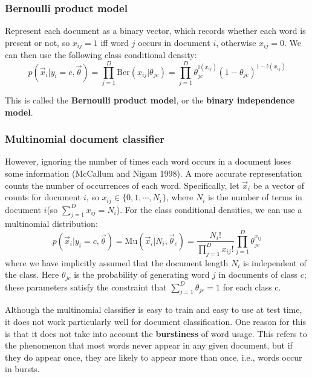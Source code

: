\subsubsection{Bernoulli product model}
Represent each document as a binary vector, which records whether each word is present or not, so $x_{ij} =1$ iff word $j$ occurs in document $i$, otherwise $x_{ij} =0$. We can then use the following class conditional density:
\begin{equation}
p(\vec{x}_i|y_i=c,\vec{\theta})=\prod\limits_{j=1}^D \text{Ber}(x_{ij}|\theta_{jc})=\prod\limits_{j=1}^D \theta_{jc}^{\mathbb{I}(x_{ij})}(1-\theta_{jc})^{1-\mathbb{I}(x_{ij})}
\end{equation}

This is called the \textbf{Bernoulli product model}, or the \textbf{binary independence model}.

\subsubsection{Multinomial document classifier}
However, ignoring the number of times each word occurs in a document loses some information (McCallum and Nigam 1998). A more accurate representation counts the number of occurrences of each word. Specifically, let $\vec{x}_i$ be a vector of counts for document $i$, so $x_{ij} \in \{0,1,\cdots,N_i\}$, where $N_i$ is the number of terms in document $i$(so $\sum\limits_{j=1}^D x_{ij}=N_i$). For the class conditional densities, we can use a multinomial distribution:
\begin{equation}\label{eqn:Multinomial-document-classifier}
p(\vec{x}_i|y_i=c,\vec{\theta})=\text{Mu}(\vec{x}_i|N_i,\vec{\theta}_c)=\dfrac{N_i!}{\prod_{j=1}^D x_{ij}!}\prod\limits_{j=1}^D \theta_{jc}^{x_{ij}}
\end{equation}
where we have implicitly assumed that the document length $N_i$ is independent of the class. Here $θ_{jc}$ is the probability of generating word $j$ in documents of class $c$; these parameters satisfy the constraint that $\sum_{j=1}^D \theta_{jc}=1$ for each class c.

Although the multinomial classifier is easy to train and easy to use at test time, it does not work particularly well for document classification. One reason for this is that it does not take into account the \textbf{burstiness} of word usage. This refers to the phenomenon that most words never appear in any given document, but if they do appear once, they are likely to appear more than once, i.e., words occur in bursts.

